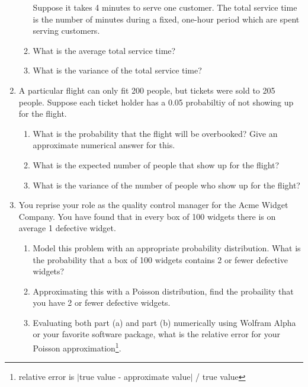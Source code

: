 \documentclass[12pt]{article}
\begin{document}
\begin{enumerate}
\begin{enumerate}
Suppose it takes 4 minutes to serve one customer. The total service time is the number of minutes during a fixed, one-hour period which are spent serving customers.
\item What is the average total service time?
\item What is the variance of the total service time?
\end{enumerate}

\item A particular flight can only fit 200 people, but tickets were sold to 205 people. Suppose each ticket holder has a 0.05 probabiltiy of not showing up for the flight.
\begin{enumerate}
\item What is the probability that the flight will be overbooked? Give an approximate numerical answer for this.
\item What is the expected number of people that show up for the flight?
\item What is the variance of the number of people who show up for the flight?
\end{enumerate}

\item You reprise your role as the quality control manager for the Acme Widget Company. You have found that in every box of 100 widgets there is on average 1 defective widget.
\begin{enumerate}
\item Model this problem with an appropriate probability distribution. What is the probability that a box of 100 widgets contains 2 or fewer defective widgets?
\item Approximating this with a Poisson distribution, find the probaility that you have 2 or fewer defective widgets.
\item Evaluating both part (a) and part (b) numerically using Wolfram Alpha or your favorite software package, what is the relative error for your Poisson approximation\footnote{relative error is $|$true value - approximate value$|$ / true value}.
\end{enumerate}

\end{enumerate}
\end{document}
